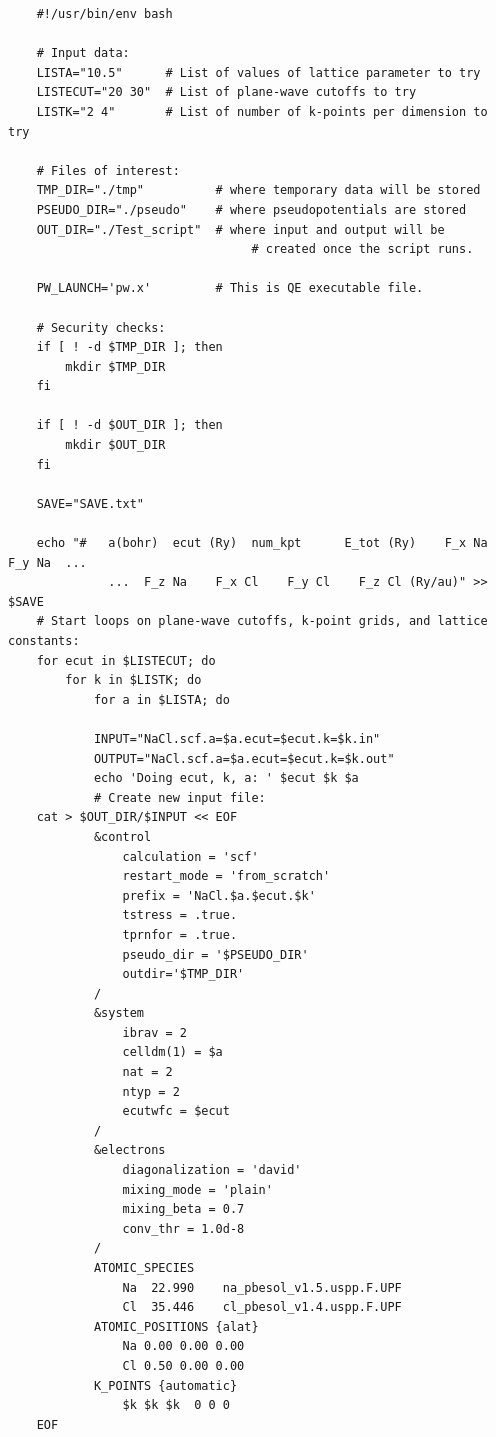 \documentclass[12pt]{article}
\begin{document}
    \begin{verbatim}
    #!/usr/bin/env bash

    # Input data:
    LISTA="10.5"      # List of values of lattice parameter to try
    LISTECUT="20 30"  # List of plane-wave cutoffs to try
    LISTK="2 4"       # List of number of k-points per dimension to try

    # Files of interest:
    TMP_DIR="./tmp"          # where temporary data will be stored
    PSEUDO_DIR="./pseudo"    # where pseudopotentials are stored
    OUT_DIR="./Test_script"  # where input and output will be
                                  # created once the script runs.

    PW_LAUNCH='pw.x'         # This is QE executable file.

    # Security checks:
    if [ ! -d $TMP_DIR ]; then
        mkdir $TMP_DIR
    fi

    if [ ! -d $OUT_DIR ]; then
        mkdir $OUT_DIR
    fi

    SAVE="SAVE.txt"

    echo "#   a(bohr)  ecut (Ry)  num_kpt      E_tot (Ry)    F_x Na    F_y Na  ...  
              ...  F_z Na    F_x Cl    F_y Cl    F_z Cl (Ry/au)" >> $SAVE
    # Start loops on plane-wave cutoffs, k-point grids, and lattice constants:
    for ecut in $LISTECUT; do
        for k in $LISTK; do
            for a in $LISTA; do

            INPUT="NaCl.scf.a=$a.ecut=$ecut.k=$k.in"
            OUTPUT="NaCl.scf.a=$a.ecut=$ecut.k=$k.out"
            echo 'Doing ecut, k, a: ' $ecut $k $a
            # Create new input file:
    cat > $OUT_DIR/$INPUT << EOF
            &control
                calculation = 'scf'
                restart_mode = 'from_scratch'
                prefix = 'NaCl.$a.$ecut.$k'
                tstress = .true.
                tprnfor = .true.
                pseudo_dir = '$PSEUDO_DIR'
                outdir='$TMP_DIR'
            /
            &system
                ibrav = 2
                celldm(1) = $a
                nat = 2
                ntyp = 2
                ecutwfc = $ecut
            /
            &electrons
                diagonalization = 'david'
                mixing_mode = 'plain'
                mixing_beta = 0.7
                conv_thr = 1.0d-8
            /
            ATOMIC_SPECIES
                Na  22.990    na_pbesol_v1.5.uspp.F.UPF
                Cl  35.446    cl_pbesol_v1.4.uspp.F.UPF
            ATOMIC_POSITIONS {alat} 
                Na 0.00 0.00 0.00
                Cl 0.50 0.00 0.00
            K_POINTS {automatic}
                $k $k $k  0 0 0
    EOF


\end{verbatim}
\end{document}
